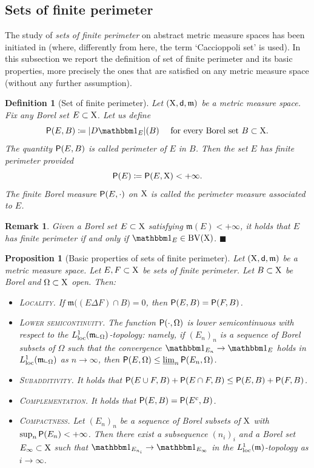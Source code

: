 \documentclass[reqno]{amsart}
\numberwithin{equation}{section}
\newcommand{\X}{{\rm X}}
\newcommand{\sfd}{{\sf d}}
\newcommand{\mm}{\mathfrak m}
\newcommand{\1}{\mathbbm 1}
\newcommand{\limi}{\varliminf}
\newcommand{\loc}{{\rm loc}}
\newcommand{\BV}{{\rm BV}}
\renewcommand{\P}{{\sf P}}
\newcommand{\fr}{\penalty-20\null\hfill\(\blacksquare\)}
\newtheorem{proposition}[theorem]{Proposition}
\newtheorem{definition}[theorem]{Definition}
\newtheorem{remark}[theorem]{Remark}
\begin{document}
\subsection{Sets of finite perimeter}
%
%
The study of \emph{sets of finite perimeter} on abstract metric measure spaces
has been initiated in \cite{Miranda03} (where, differently from here, the term
`Caccioppoli set' is used). In this subsection we report the definition of set
of finite perimeter and its basic properties, more precisely the ones that are
satisfied on any metric measure space (without any further assumption).
%
%
\begin{definition}[Set of finite perimeter]
Let \((\X,\sfd,\mm)\) be a metric measure space. Fix any Borel set
\(E\subset\X\). Let us define
\[
\P(E,B)\coloneqq|D\1_E|(B)\quad\text{ for every Borel set }B\subset\X.
\]
The quantity \(\P(E,B)\) is called \emph{perimeter of \(E\) in \(B\)}.
Then the set \(E\) \emph{has finite perimeter} provided
\[
\P(E)\coloneqq\P(E,\X)<+\infty.
\]
The finite Borel measure \(\P(E,\cdot)\) on \(\X\) is called
the \emph{perimeter measure} associated to \(E\).
\end{definition}
%
%
\begin{remark}{\rm
Given a Borel set \(E\subset\X\) satisfying \(\mm(E)<+\infty\), it holds that
\(E\) has finite perimeter if and only if \(\1_E\in\BV(\X)\).
\fr}\end{remark}
%
%
\begin{proposition}[Basic properties of sets of finite perimeter]
\label{prop:properties_finite_perimeter_sets}
Let \((\X,\sfd,\mm)\) be a metric measure space. Let \(E,F\subset\X\) be sets of
finite perimeter. Let \(B\subset\X\) be Borel and \(\Omega\subset\X\) open. Then:
\begin{itemize}
\item[\(\rm i)\)] \textsc{Locality.} If \(\mm\big((E\Delta F)\cap B\big)=0\),
then \(\P(E,B)=\P(F,B)\).
\item[\(\rm ii)\)] \textsc{Lower semicontinuity.} The function \(\P(\cdot,\Omega)\)
is lower semicontinuous with respect to the \(L^1_\loc(\mm\llcorner_\Omega)\)-topology:
namely, if \((E_n)_n\) is a sequence of Borel subsets of \(\Omega\)
such that the convergence \(\1_{E_n}\to\1_E\) holds in \(L^1_\loc(\mm\llcorner_\Omega)\)
as \(n\to\infty\), then \(\P(E,\Omega)\leq\limi_n\P(E_n,\Omega)\).
\item[\(\rm iii)\)] \textsc{Subadditivity.} It holds that
\(\P(E\cup F,B)+\P(E\cap F,B)\leq\P(E,B)+\P(F,B)\).
\item[\(\rm vi)\)] \textsc{Complementation.} It holds that \(\P(E,B)=\P(E^c,B)\).
\item[\(\rm v)\)] \textsc{Compactness.} Let \((E_n)_n\) be a sequence
of Borel subsets of \(\X\) with \(\sup_n\P(E_n)<+\infty\). Then there exist a
subsequence \((n_i)_i\) and a Borel set \(E_\infty\subset\X\) such that
\(\1_{E_{n_i}}\to\1_{E_\infty}\) in the \(L^1_\loc(\mm)\)-topology as \(i\to\infty\).
\end{itemize}
\end{proposition}
%
%
%
%
\end{document}

